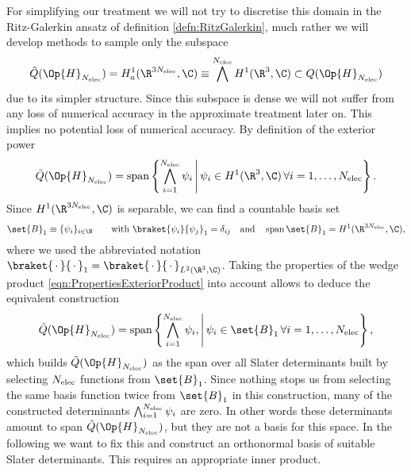 For simplifying our treatment
we will not try to discretise this domain in the Ritz-Galerkin ansatz
of definition \ref{defn:RitzGalerkin},
much rather we will develop methods to sample only the subspace
\[ \tilde{Q}(\Op{H}_{\Nelec}) = H^1_a(\R^{3\Nelec}, \C) \equiv \bigwedge^{\Nelec} H^1(\R^3, \C) \subset Q(\Op{H}_{\Nelec}) \]
due to its simpler structure.
Since this subspace is dense we will not suffer from any loss of numerical
accuracy in the approximate treatment later on.
This implies no potential loss of numerical accuracy.
By definition of the exterior power
\begin{equation}
	\tilde{Q}(\Op{H}_{\Nelec}) = \spacespan \left\{
		\bigwedge_{i=1}^{\Nelec} \psi_i
		\, \middle| \,
		\psi_i \in H^1(\R^3, \C) \, \forall i = 1, \ldots, \Nelec
	\right\}.
	\label{eqn:FormDomainAllFunctions}
\end{equation}
Since $H^1(\R^{3\Nelec}, \C)$ is separable, we can find a countable basis set
\begin{equation}
	\set{B}_1 \equiv \{\psi_i\}_{i \in \N} \qquad \text{with }
	\braket{\psi_i}{\psi_j}_1 = \delta_{ij}
	\quad \text{and} \quad \spacespan \set{B}_1 = H^1(\R^{3\Nelec}, \C),
	\label{eqn:OneParticleBasis}
\end{equation}
where we used the abbreviated notation
$\braket{\slot}{\slot}_1 = \braket{\slot}{\slot}_{L^2(\R^3, \C)}$.
Taking the properties of the wedge product \eqref{eqn:PropertiesExteriorProduct}
into account allows to deduce the equivalent construction
\begin{equation}
	\label{eqn:FormDomainSlaterDeterminants}
	\tilde{Q}(\Op{H}_{\Nelec}) = \spacespan
	\left\{ \bigwedge_{i=1}^{\Nelec} \psi_i
	, \middle| \, \psi_i \in \set{B}_1 \, \forall i=1,\ldots,\Nelec
	\right\},
\end{equation}
which builds $\tilde{Q}(\Op{H}_{\Nelec})$ as the span
over all Slater determinants built by selecting
$N_\text{elec}$ functions from $\set{B}_1$.
Since nothing stops us from selecting the same basis function
twice from $\set{B}_1$ in this construction,
many of the constructed determinants $\bigwedge_{i=1}^{N_\text{elec}} \psi_i$
are zero.
In other words these determinants amount to span $\tilde{Q}(\Op{H}_{\Nelec})$,
but they are not a basis for this space.
In the following we want to fix this and construct an orthonormal basis
of suitable Slater determinants.
This requires an appropriate inner product.
